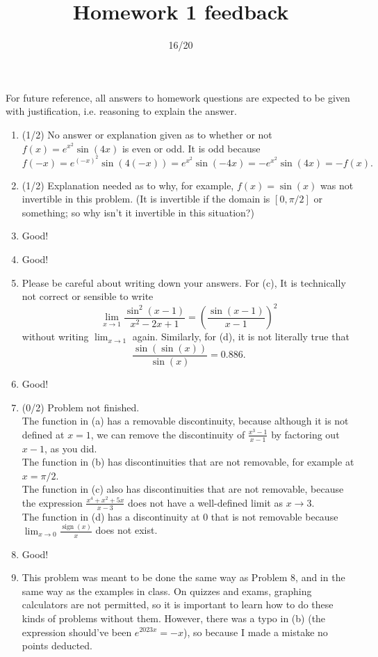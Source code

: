 \documentclass{article}
\title{Homework 1 feedback}
\author{16/20}
\date{}
\begin{document}
\maketitle
For future reference, all answers to homework questions are expected to be given with justification, i.e. reasoning to explain the answer.
\begin{enumerate}
	\item (1/2) No answer or explanation given as to whether or not $f(x) = e^{x^{2}} \sin(4x)$ is even or odd. It is odd because
		\[
			f(-x) = e^{(-x)^{2}} \sin(4(-x)) = e^{x^{2}} \sin(-4x) = - e^{x^{2}} \sin(4x) = - f(x).
		\]
	\item (1/2) Explanation needed as to why, for example, $f(x) = \sin(x)$ was not invertible in this problem. (It is invertible if the domain is $[0, \pi/2]$ or something; so why isn't it invertible in this situation?)
	\item Good!
	\item Good!
	\item Please be careful about writing down your answers. For (c), It is technically not correct or sensible to write
		\[
			\lim_{x \to 1} \frac{\sin^{2}(x-1)}{x^{2}-2x+1} = \left( \frac{\sin(x-1)}{x-1} \right)^{2}
		\]
		without writing $\lim_{x \to 1}$ again. Similarly, for (d), it is not literally true that
		\[
			\frac{\sin(\sin(x))}{\sin(x)} = 0.886.
		\]
	\item Good!
	\item (0/2) Problem not finished. \\
		The function in (a) has a removable discontinuity, because although it is not defined at $x=1$, we can remove the discontinuity of $\frac{x^{3} - 1}{x-1}$ by factoring out $x-1$, as you did.\\
		The function in (b) has discontinuities that are not removable, for example at $x = \pi/2$.\\
		The function in (c) also has discontinuities that are not removable, because the expression $\frac{x^{4}+x^{2}+5x}{x-3}$ does not have a well-defined limit as $x \to 3$.\\
		The function in (d) has a discontinuity at $0$ that is not removable because $\lim_{x \to 0}  \frac{\operatorname{sign}(x)}{x}$ does not exist.
	\item Good!
	\item This problem was meant to be done the same way as Problem 8, and in the same way as the examples in class. On quizzes and exams, graphing calculators are not permitted, so it is important to learn how to do these kinds of problems without them. However, there was a typo in (b) (the expression should've been $e^{2023x} = -x$), so because I made a mistake no points deducted.
\end{enumerate}
\end{document}
